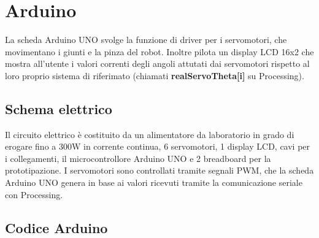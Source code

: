 \documentclass[a4paper]{article}
\begin{document}
    
    
    \section{Arduino}
    
    \begin{text}
        La scheda Arduino UNO svolge la funzione di driver per i servomotori, che movimentano i giunti e la pinza del robot. Inoltre pilota un display LCD 16x2 che mostra all'utente i valori correnti degli angoli attutati dai servomotori rispetto al loro proprio sistema di riferimato (chiamati \textbf{realServoTheta[i]} su Processing).
    \end{text}
    
    \subsection{Schema elettrico}
    
    \begin{text}
        Il circuito elettrico è costituito da un alimentatore da laboratorio in grado di erogare fino a 300W in corrente continua, 6 servomotori, 1 display LCD, cavi per i collegamenti, il microcontrollore Arduino UNO e 2 breadboard per la prototipazione. I servomotori sono controllati tramite segnali PWM, che la scheda Arduino UNO genera in base ai valori ricevuti tramite la comunicazione seriale con Processing.
    \end{text}
    
    \subsection{Codice Arduino}
    
\end{document}

